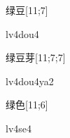 \begin{verbete}[lv4dou4]{绿豆}[11;7]
\begin{pronuncia}{lv4dou4}
\end{pronuncia}
\end{verbete}

\begin{verbete}[lv4dou4ya2]{绿豆芽}[11;7;7]
\begin{pronuncia}{lv4dou4ya2}
\end{pronuncia}
\end{verbete}

\begin{verbete}[lv4se4]{绿色}[11;6]
\begin{pronuncia}{lv4se4}
\end{pronuncia}
\end{verbete}

